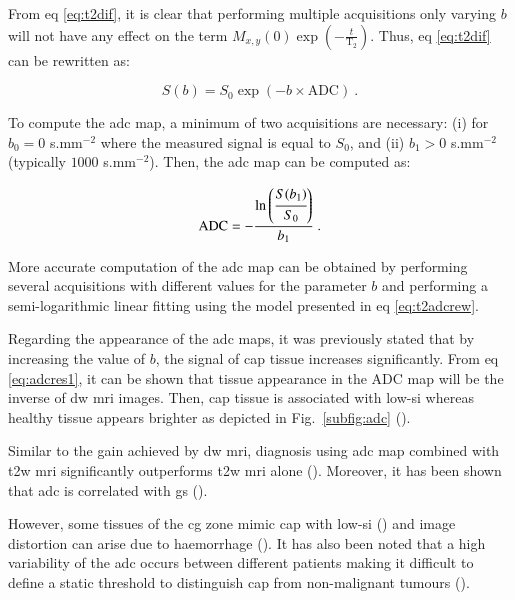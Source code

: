 \begin{enumerate}[leftmargin=*]
From \acs{eq} \ref{eq:t2dif}, it is clear that performing multiple acquisitions only varying $b$ will not have any effect on the term  $M_{x,y}(0) \exp \left( - \frac{t}{\text{T}_2} \right)$. Thus, \acs{eq} \ref{eq:t2dif} can be rewritten as:

\begin{equation}
	S(b) = S_0 \exp \left( -b \times \text{ADC} \right) \ .
	\label{eq:t2adcrew}
\end{equation}

To compute the \ac{adc} map, a minimum of two acquisitions are necessary: (i) for $b_0=0$ s.mm$^{-2}$ where the measured signal is equal to $S_0$, and (ii) $b_1>0$ s.mm$^{-2}$ (typically $1000$ s.mm$^{-2}$). Then, the \ac{adc} map can be computed as:

\begin{equation}
	\text{ADC} = - \frac{\ln \left( \cfrac{S(b_1)}{S_0} \right) }{b_1} \ .
	\label{eq:adcres1}
\end{equation}

More accurate computation of the \ac{adc} map can be obtained by performing several acquisitions with different values for the parameter $b$ and performing a semi-logarithmic linear fitting using the model presented in \acs{eq} \eqref{eq:t2adcrew}.

Regarding the appearance of the \ac{adc} maps, it was previously stated that by increasing the value of $b$, the signal of \ac{cap} tissue increases significantly. From \acs{eq} \eqref{eq:adcres1}, it can be shown that tissue appearance in the ADC map will be the inverse of \ac{dw} \ac{mri} images. Then, \ac{cap} tissue is associated with low-\ac{si} whereas healthy tissue appears brighter as depicted in Fig.~\ref{subfig:adc} (\cite{Barentsz2012}).

Similar to the gain achieved by \ac{dw} \ac{mri}, diagnosis using \ac{adc} map combined with \ac{t2w} \ac{mri} significantly outperforms \ac{t2w} \ac{mri} alone (\cite{Doo2012,Choi2007}). Moreover, it has been shown that \ac{adc} is correlated with \ac{gs} (\cite{Hambrock2011, Itou2011, Peng2013}).

However, some tissues of the \ac{cg} zone mimic \ac{cap} with low-\ac{si} (\cite{Kirkham2006}) and image distortion can arise due to haemorrhage (\cite{Choi2007}). It has also been noted that a high variability of the \ac{adc} occurs between different patients making it difficult to define a static threshold to distinguish \ac{cap} from non-malignant tumours (\cite{Choi2007}). 


\end{enumerate}
